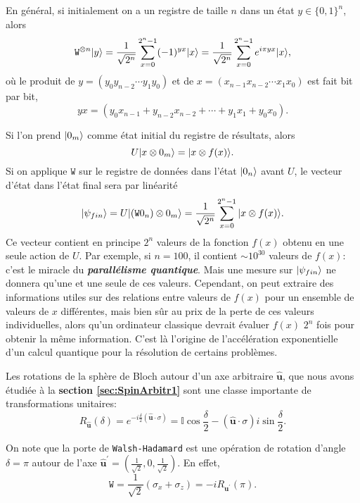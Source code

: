 En général, si initialement on a un registre de taille $n$ dans un état
$y\in\{0,1\}^n$, alors
\begin{equation}
\mathtt{W}^{\otimes n}\vert y\rangle=\frac{1}{\sqrt{2^n}}\sum_{x=0}^{2^n-1}(-1)^{yx}
\vert x\rangle=\frac{1}{\sqrt{2^n}}\sum_{x=0}^{2^n-1}e^{i\pi yx}\vert x\rangle,
\end{equation}
où le produit de $y=(y_0y_{n-2}\cdots y_1y_0)$ et de $x=(x_{n-1}x_{n-2}\cdots
x_1x_0)$ est fait bit par bit,
\begin{equation}
yx=(y_0x_{n-1}+y_{n-2}x_{n-2}+\cdots+y_1x_1+y_0x_0).
\end{equation}

Si l'on prend $\vert0_{m}\rangle$ comme état initial du registre de résultats, alors%
\begin{equation}
U\vert x\otimes0_{m}\rangle =\vert x\otimes f(x)\rangle.
\end{equation}
Si on applique $\mathtt{W}$ sur le registre de données dans l'état
$\vert0_{n}\rangle$ avant
$U$, le vecteur d'état dans l'état final sera par linéarité%
\begin{equation}
\vert\psi_{fin}\rangle=U\vert(\mathtt{W}0_{n})\otimes0_{m}\rangle=\frac{1}{\sqrt{2^n}}
\sum_{x=0}^{2^n-1}\vert x\otimes f(x)\rangle .
\end{equation}
Ce vecteur contient en principe $2^n$ valeurs de la fonction $f(x)$ obtenu en
une seule action de $U$. Par exemple, si $n=100$, il contient $\sim10^{30}$
valeurs de $f(x)$: c'est le miracle du \textbf{\emph{parallélisme quantique}}.
Mais une mesure sur $\vert\psi_{fin}\rangle$ ne donnera qu'une et une seule de ces
valeurs. Cependant, on peut extraire des informations utiles sur des relations
entre valeurs de $f(x)$ pour un ensemble de valeurs de $x$ différentes, mais
bien sûr au prix de la perte de ces valeurs individuelles, alors qu'un
ordinateur classique devrait évaluer $f(x)$ $2^n$ fois pour obtenir la même
information. C'est là l'origine de l'accélération exponentielle d'un calcul
quantique pour la résolution de certains problèmes.

\begin{remark}
 Les rotations de la sphère de Bloch autour d'un axe arbitraire
$\boldsymbol{\hat{u}}$, que nous avons étudiée à la \textbf{section
\ref{sec:SpinArbitr1}} sont une classe importante de transformations unitaires:
\begin{equation}
R_{\boldsymbol{\hat{u}}}(\delta)=e^{-i\frac{\delta}{2}(\boldsymbol{\hat{u}}
\cdot\sigma)}=\mathbb{I}\cos\frac{\delta}{2}-(\boldsymbol{\hat{u}}
\cdot\sigma)i\sin\frac{\delta}{2}.
\end{equation}

On note que la porte de \texttt{Walsh-Hadamard} est une opération de rotation
d'angle $\delta=\pi$ autour de l'axe $\boldsymbol{\hat{u}}^{\prime}
=(\frac{1}{\sqrt{2}},0,\frac{1}{\sqrt{2}})$. En effet,%
\begin{equation}
\mathtt{W}=\frac{1}{\sqrt{2}}(\sigma_{x}+\sigma_{z})
=-iR_{\boldsymbol{u}^{\prime}}(\pi).
\end{equation}
\end{remark}

